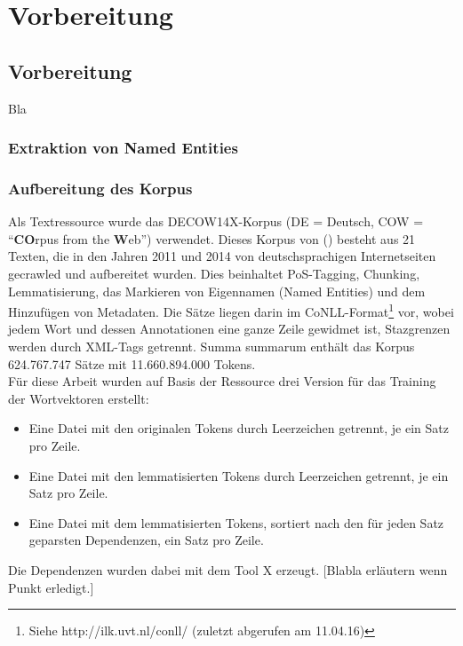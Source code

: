 
\chapter{Vorbereitung} %

\label{Chapter4} %


\section{Vorbereitung}
Bla

  \subsection{Extraktion von Named Entities}

  \subsection{Aufbereitung des Korpus}

  Als Textressource wurde das DECOW14X-Korpus (DE = Deutsch, COW = ``\textbf{CO}rpus from the \textbf{W}eb'') verwendet.
  Dieses Korpus von (\cite{schafer2012building})  besteht aus 21 Texten,
  die in den Jahren 2011 und 2014 von deutschsprachigen Internetseiten gecrawled und aufbereitet wurden. Dies beinhaltet
  PoS-Tagging, Chunking, Lemmatisierung, das Markieren von Eigennamen (Named Entities) und dem Hinzufügen von Metadaten.
  Die Sätze liegen darin im CoNLL-Format\footnote{Siehe http://ilk.uvt.nl/conll/ (zuletzt abgerufen am 11.04.16)} vor,
  wobei jedem Wort und dessen Annotationen eine ganze Zeile gewidmet ist,
  Stazgrenzen werden durch XML-Tags getrennt. Summa summarum enthält das Korpus 624.767.747 Sätze mit 11.660.894.000 Tokens.\\

  Für diese Arbeit wurden auf Basis der Ressource drei Version für das Training der Wortvektoren erstellt:
  \begin{itemize}
      \item Eine Datei mit den originalen Tokens durch Leerzeichen getrennt, je ein Satz pro Zeile.
      \item Eine Datei mit den lemmatisierten Tokens durch Leerzeichen getrennt, je ein Satz pro Zeile.
      \item Eine Datei mit dem lemmatisierten Tokens, sortiert nach den für jeden Satz geparsten Dependenzen, ein Satz pro Zeile.
  \end{itemize}
  Die Dependenzen wurden dabei mit dem Tool X erzeugt. [Blabla erläutern wenn Punkt erledigt.]


